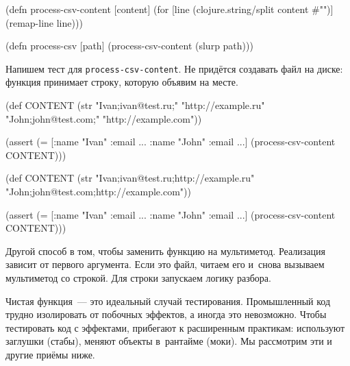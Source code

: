 \else

\begin{english}
  \begin{clojure}
(defn process-csv-content [content]
  (for [line (clojure.string/split content #"\n")]
    (remap-line line)))

(defn process-csv [path]
  (process-csv-content (slurp path)))
  \end{clojure}
\end{english}

\fi

Напишем тест для \verb|process-csv-content|. Не придётся создавать файл на
диске: функция принимает строку, которую объявим на месте.

\ifx\devicetype\mobile

\begin{english}
  \begin{clojure}
(def CONTENT
  (str "Ivan;ivan@test.ru;"
       "http://example.ru"
       \newline
       "John;john@test.com;"
       "http://example.com"))

(assert
  (= [{:name "Ivan" :email ...}
      {:name "John" :email ...}]
     (process-csv-content CONTENT)))
  \end{clojure}
\end{english}

\else

\begin{english}
  \begin{clojure}
(def CONTENT
  (str "Ivan;ivan@test.ru;http://example.ru"
       \newline
       "John;john@test.com;http://example.com"))

(assert (= [{:name "Ivan" :email ...}
            {:name "John" :email ...}]
           (process-csv-content CONTENT)))
  \end{clojure}
\end{english}

\fi

Другой способ в том, чтобы заменить функцию на мультиметод. Реализация зависит
от первого аргумента. Если это файл, читаем его и~снова вызываем мультиметод со
строкой. Для строки запускаем логику разбора.

Чистая функция~--- это идеальный случай тестирования. Промышленный код трудно
изолировать от побочных эффектов, а иногда это невозможно. Чтобы тестировать код
с эффектами, прибегают к расширенным практикам: используют заглушки (стабы),
меняют объекты в~рантайме (моки). Мы рассмотрим эти и другие приёмы ниже.

